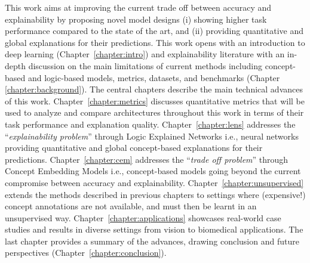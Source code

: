 \documentclass[withindex,glossary]{cam-thesis}
\theoremstyle{plain}
\theoremstyle{definition}
\theoremstyle{remark}
\begin{document}
This work aims at improving the current trade off between accuracy and explainability by proposing novel model designs (i) showing higher task performance compared to the state of the art, and (ii) providing quantitative and global explanations for their predictions. This work opens with an introduction to deep learning (Chapter~\ref{chapter:intro}) and explainability literature with an in-depth discussion on the main limitations of current methods including concept-based and logic-based models, metrics, datasets, and benchmarks (Chapter \ref{chapter:background}). The central chapters describe the main technical advances of this work. Chapter~\ref{chapter:metrics} discusses quantitative metrics that will be used to analyze and compare architectures throughout this work in terms of their task performance and explanation quality. Chapter~\ref{chapter:lens} addresses the ``\textit{explainability problem}'' through Logic Explained Networks i.e., neural networks providing quantitative and global concept-based explanations for their predictions. Chapter~\ref{chapter:cem} addresses the ``\textit{trade off problem}'' through Concept Embedding Models i.e., concept-based models going beyond the current compromise between accuracy and explainability. Chapter~\ref{chapter:unsupervised} extends the methods described in previous chapters to settings where (expensive!) concept annotations are not available, and must then be learnt in an unsupervised way. Chapter~\ref{chapter:applications} showcases real-world case studies and results in diverse settings from vision to biomedical applications. The last chapter provides a summary of the advances, drawing conclusion and future perspectives (Chapter~\ref{chapter:conclusion}).

\bigskip
\end{document}
